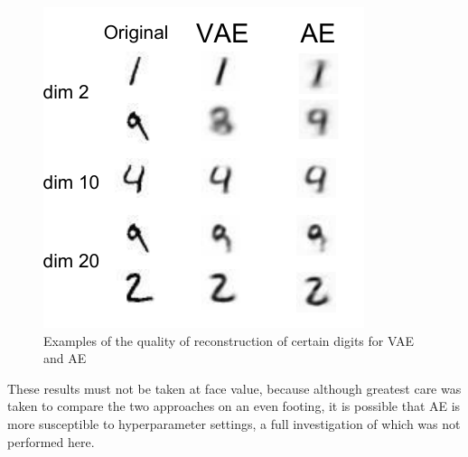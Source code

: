 \documentclass[../report.tex]{subfiles}
\begin{document}
\begin{figure}[hbt]
\centering
\hspace{0em}
\includegraphics[width=0.4\columnwidth]{../../res/recon_mnist_compre.pdf}
\caption{Examples of the quality of reconstruction of certain digits for VAE and AE}
\label{fig:AE_recon}
\end{figure}

These results must not be taken at face value, because although greatest care was taken to compare the two approaches on an even footing, it is possible that AE is more susceptible to hyperparameter settings, a full investigation of which was not performed here.\\
\end{document}
